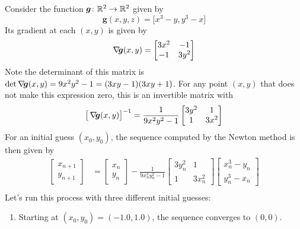 \begin{example}\label{example:preNewton4poly4}
Consider the function $\boldsymbol{g}\colon \mathbb{R}^2 \to \mathbb{R}^2$ given by
\begin{equation*}
\boldsymbol{g}(x,y,z) = \big[ x^3-y, y^3-x \big]
\end{equation*}
Its gradient at each $(x,y)$ is given by
\begin{equation*}
\mathop{\nabla\! {\boldsymbol{g}}}(x,y) = \begin{bmatrix} 3x^2 & -1 \\ -1 & 3y^2 \end{bmatrix}
\end{equation*}
Note the determinant of this matrix is $\det \mathop{\nabla\! {\boldsymbol{g}}}(x,y) = 9x^2y^2-1 = (3xy-1)(3xy+1)$.  For any point $(x,y)$ that does not make this expression zero, this is an invertible matrix with 
\begin{equation*}
\big[ \mathop{\nabla\! {\boldsymbol{g}}}(x,y)\big]^{-1} = \frac{1}{9x^2y^2-1}\begin{bmatrix} 3y^2 & 1 \\ 1 & 3x^2 \end{bmatrix}
\end{equation*}
For an initial guess $(x_0, y_0)$, the sequence computed by the Newton method is then given by
\begin{align*}
\begin{bmatrix} x_{n+1} \\ y_{n+1} \end{bmatrix} &= \begin{bmatrix} x_n \\ y_n \end{bmatrix} -\frac{1}{9 x_n^2 y_n^2-1}\begin{bmatrix} 3y_n^2 & 1 \\ 1 & 3x_n^2 \end{bmatrix} \begin{bmatrix} x_n^3-y_n \\ y_n^3-x_n \end{bmatrix} \\
\end{align*}
Let's run this process with three different initial guesses:
\begin{enumerate}
	\item Starting at $(x_0, y_0) = (-1.0,1.0)$, the sequence converges to $(0,0)$.  %

\end{enumerate}
\end{example}
